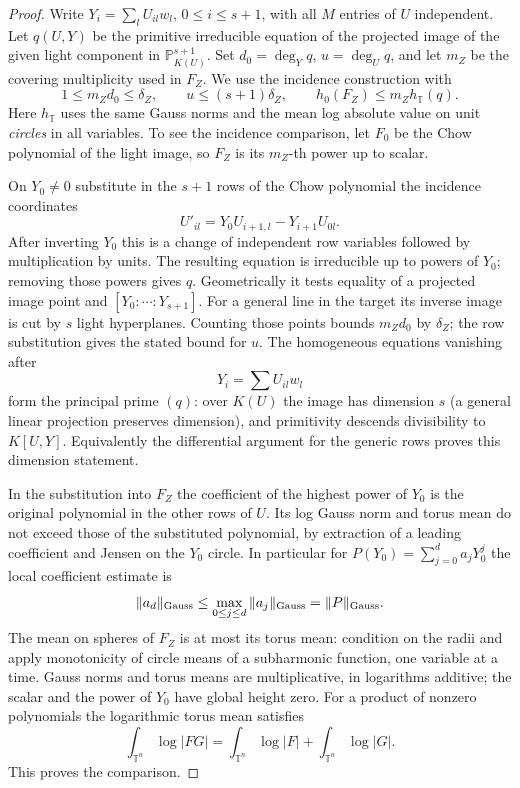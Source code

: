 \begin{proof}
Write \(Y_i=\sum_l U_{il}w_l\), \(0\le i\le s+1\), with
all \(M\) entries of \(U\) independent. Let \(q(U,Y)\) be
the primitive irreducible equation of the projected image of
the given light component in \(\mathbb P^{s+1}_{K(U)}\).
Set \(d_0=\deg_Y q\), \(u=\deg_U q\), and let \(m_Z\)
be the covering multiplicity used in \(F_Z\). We use the
incidence construction with
\[
 1\le m_Zd_0\le\delta_Z,\qquad u\le(s+1)\delta_Z,\qquad
                    h_0(F_Z)\le m_Z h_{\mathbb T}(q).
\]
Here \(h_{\mathbb T}\) uses the same Gauss norms and the
mean log absolute value on unit \emph{circles} in all
variables. To see the incidence comparison, let \(F_0\) be
the Chow polynomial of the light image, so \(F_Z\) is its
\(m_Z\)-th power up to scalar.

On \(Y_0\ne0\) substitute in the \(s+1\) rows of the Chow polynomial the incidence coordinates
\[
  U'_{i l}=Y_0U_{i+1,l}-Y_{i+1}U_{0l}.
\]
After inverting \(Y_0\) this is a change of independent row
variables followed by multiplication by units. The resulting
equation is irreducible up to powers of \(Y_0\); removing
those powers gives \(q\). Geometrically it tests equality
of a projected image point and \([Y_0:\cdots:Y_{s+1}]\).
For a general line in the target its inverse image is cut by
\(s\) light hyperplanes. Counting those points bounds
\(m_Zd_0\) by \(\delta_Z\); the row substitution gives the
stated bound for \(u\). The homogeneous equations vanishing
after 
\[
  Y_i=\sum U_{il} w_l
\]
 form the principal prime \((q)\):
over \(K(U)\) the image has dimension \(s\) (a general linear
projection preserves dimension), and primitivity descends
divisibility to \(K[U,Y]\). Equivalently the differential
argument for the generic rows proves this dimension statement.

In the substitution into \(F_Z\) the coefficient of the
highest power of \(Y_0\) is the original polynomial in the
other rows of \(U\). Its log Gauss norm and torus mean do not
exceed those of the substituted polynomial, by extraction
of a leading coefficient and Jensen on the \(Y_0\) circle.
In particular for \(P(Y_0)=\sum_{j=0}^d a_jY_0^j\) the local coefficient estimate is
\[
  \|a_d\|_{\rm Gauss}\le\max_{0\le j\le d}\|a_j\|_{\rm Gauss}=\|P\|_{\rm Gauss}.
\]
The mean on spheres of \(F_Z\) is at most its torus mean:
condition on the radii and apply monotonicity of circle
means of a subharmonic function, one variable at a time.
Gauss norms and torus means are multiplicative, in logarithms
additive; the scalar and the power of \(Y_0\) have global
height zero.
For a product of nonzero polynomials the logarithmic torus mean satisfies
\[
  \int_{\mathbb T^n}\log|FG|=\int_{\mathbb T^n}\log|F|+\int_{\mathbb T^n}\log|G| .
\]
 This proves the comparison.


\end{proof}

